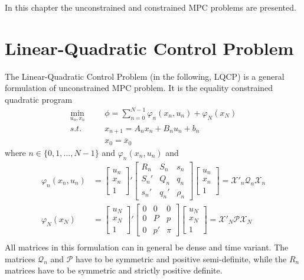 \documentclass[a4paper]{report}
\begin{document}
In this chapter the unconstrained and constrained MPC problems are presented.

\section{Linear-Quadratic Control Problem}

The Linear-Quadratic Control Problem (in the following, LQCP) is a general formulation of unconstrained MPC problem.
It is the equality constrained quadratic program
\begin{equation}
\begin{aligned}
\min_{u_n,x_n} &&& \phi = \sum_{n=0}^{N-1} \varphi_n(x_n,u_n) + \varphi_N(x_N) \\
s.t. &&& x_{n+1} = A_nx_n+B_nu_n+b_n \\
&&& x_0 = \overline x_0
\end{aligned}
\label{lqcp}
\end{equation}
where $n\in\{0,1,\dots,N-1\}$ and $\varphi_n(x_n,u_n)$ and
\begin{equation}
\begin{aligned}
\varphi_n(x_n,u_n) &= \begin{bmatrix} u_n \\ x_n \\ 1 \end{bmatrix}' \begin{bmatrix} R_n&S_n&s_n \\ S_n'&Q_n&q_n \\ s_n'&q_n'& \rho_n \end{bmatrix} \begin{bmatrix} u_n \\ x_n \\ 1 \end{bmatrix}  = \mathcal{X}'_n\mathcal{Q}_n\mathcal{X}_n \\
\varphi_N(x_N) &= \begin{bmatrix} u_N \\ x_N \\ 1 \end{bmatrix}' \begin{bmatrix} 0&0&0 \\ 0&P&p \\ 0&p'&\pi \end{bmatrix} \begin{bmatrix} u_N \\ x_N \\ 1 \end{bmatrix} = \mathcal{X}'_N\mathcal{P}\mathcal{X}_N\\ 
\end{aligned}
\label{cflq}
\end{equation}
All matrices in this formulation can in general be dense and time variant. The matrices $\mathcal Q_n$ and $\mathcal P$ have to be symmetric and positive semi-definite, while the $R_n$ matrices have to be symmetric and strictly positive definite.
\end{document}
